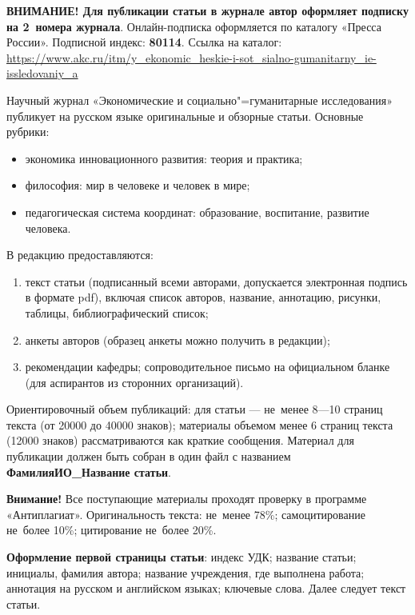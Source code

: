 \begin{multicols}{2}


    \textbf{ВНИМАНИЕ! Для публикации статьи
    в журнале автор оформляет подписку на
    \mbox{2 номера} журнала}. Онлайн-подписка оформляется по каталогу «Пресса России». Подписной индекс: \textbf{80114}. Ссылка на каталог:
    \url{https://www.akc.ru/itm/y_ekonomic_heskie-i-sot_sialno-gumanitarny_ie-issledovaniy_a}

    Научный журнал «Экономические и социально"=гуманитарные исследования» публикует на русском языке оригинальные и обзорные статьи. Основные рубрики:
\begin{itemize}
    \item  экономика инновационного развития:
    теория и практика;
    \item  философия: мир в человеке и человек
    в мире;
    \item  педагогическая система координат: образование, воспитание, развитие человека.
\end{itemize}    

    В редакцию предоставляются:
\begin{enumerate}[label=\arabic*)]
    \item текст статьи (подписанный всеми авторами, допускается электронная подпись
    в формате pdf), включая список авторов, название, аннотацию, рисунки, таблицы, библиографический список;
    \item  анкеты авторов (образец анкеты можно получить в редакции);
    \item  рекомендации кафедры; сопроводительное письмо на официальном бланке
    (для аспирантов из сторонних организаций).
\end{enumerate}
    Ориентировочный объем публикаций: для
    статьи — не~менее 8—10 страниц текста
    (от \num{20000} до \num{40000} знаков); материалы объемом менее 6 страниц текста (\num{12000} знаков)
    рассматриваются как краткие сообщения.
    Материал для публикации должен быть
    собран в один файл с названием \textbf{ФамилияИО\_Название статьи}.

    \textbf{Внимание!} Все поступающие материалы
    проходят проверку в программе «Антиплагиат». Оригинальность текста: не~менее 78\%;
    самоцитирование не~более 10\%; цитирование не~более 20\%.

    \textbf{Оформление первой страницы статьи}:
    индекс УДК; название статьи; инициалы,
    фамилия автора; название учреждения, где
    выполнена работа; аннотация на русском
    и английском языках; ключевые слова. Далее
    следует текст статьи.
    

\end{multicols}
